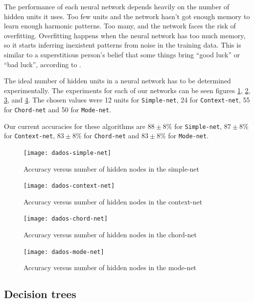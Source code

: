 \documentclass{article}
\begin{document}
The performance of each neural network depends heavily on the number
of hidden units it uses. Too few units and the network hasn't got
enough memory to learn enough harmonic patterns. Too many, and the
network faces the risk of overfitting. Overfitting happens when the
neural network has too much memory, so it starts inferring inexistent
patterns from noise in the training data. This is similar to a
superstitious person's belief that some things bring ``good luck'' or
``bad luck'', according to \cite{white.ea:superstitious}.

The ideal number of hidden units in a neural network has to be
determined experimentally. The experiments for each of our networks
can be seen figures \ref{fig:simple-net}, \ref{fig:context-net},
\ref{fig:chord-net}, and \ref{fig:mode-net}. The chosen values were 12
units for \texttt{Sim\-ple\--net}, 24 for \texttt{Context-net}, 55 for
\texttt{Chord-net} and 50 for \texttt{Mode-net}.

Our current accuracies for these algorithms are $88\pm 8\%$ for
\texttt{Simple-net}, $87 \pm 8\%$ for \texttt{Context-net}, $83 \pm
8\%$ for \texttt{Chord-net} and $83 \pm 8\%$ for \texttt{Mode-net}.

\begin{figure}
  \texttt{[image: dados-simple-net]}
  \caption{Accuracy versus number of hidden nodes in the simple-net}
  \label{fig:simple-net}
\end{figure}

\begin{figure}
  \texttt{[image: dados-context-net]}
  \caption{Accuracy versus number of hidden nodes in the context-net}
  \label{fig:context-net}
\end{figure}

\begin{figure}
  \texttt{[image: dados-chord-net]}
  \caption{Accuracy versus number of hidden nodes in the chord-net}
  \label{fig:chord-net}
\end{figure}

\begin{figure}
  \texttt{[image: dados-mode-net]}
  \caption{Accuracy versus number of hidden nodes in the mode-net}
  \label{fig:mode-net}
\end{figure}

\subsection{Decision trees}
\label{sec:decision-trees}
\end{document}
